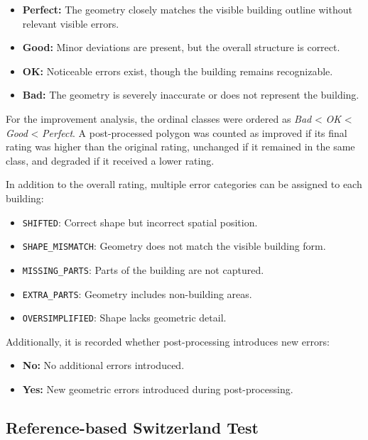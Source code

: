 \begin{itemize}
    \item \textbf{Perfect:} The geometry closely matches the visible building outline without relevant visible errors.
    \item \textbf{Good:} Minor deviations are present, but the overall structure is correct.
    \item \textbf{OK:} Noticeable errors exist, though the building remains recognizable.
    \item \textbf{Bad:} The geometry is severely inaccurate or does not represent the building.
\end{itemize}

For the improvement analysis, the ordinal classes were ordered as \textit{Bad} < \textit{OK} < \textit{Good} < \textit{Perfect}. A post-processed polygon was counted as improved if its final rating was higher than the original rating, unchanged if it remained in the same class, and degraded if it received a lower rating.

In addition to the overall rating, multiple error categories can be assigned to each building:

\begin{itemize}
    \item \texttt{SHIFTED}: Correct shape but incorrect spatial position.
    \item \texttt{SHAPE\_MISMATCH}: Geometry does not match the visible building form.
    \item \texttt{MISSING\_PARTS}: Parts of the building are not captured.
    \item \texttt{EXTRA\_PARTS}: Geometry includes non-building areas.
    \item \texttt{OVERSIMPLIFIED}: Shape lacks geometric detail.
\end{itemize}

Additionally, it is recorded whether post-processing introduces new errors:

\begin{itemize}
    \item \textbf{No:} No additional errors introduced.
    \item \textbf{Yes:} New geometric errors introduced during post-processing.
\end{itemize}

\subsection{Reference-based Switzerland Test}
\label{sec:switzerland_reference_test}

